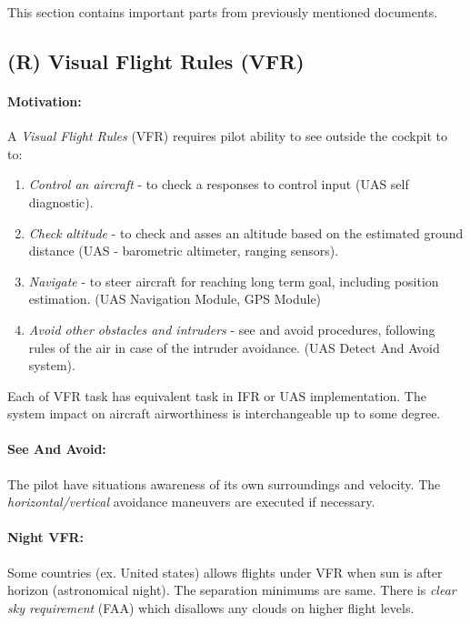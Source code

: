 \begin{note}
    This section contains important parts from previously mentioned documents. 
\end{note}

\subsection{(R) Visual Flight Rules (VFR)}\label{sec:VisualFlightRules}
\paragraph{Motivation:} A \emph{Visual Flight Rules} (VFR) requires pilot ability to see outside the cockpit to to:

\begin{enumerate}
    \item \emph{Control an aircraft} - to check a responses to control input (UAS self diagnostic).
    
    \item \emph{Check altitude} - to check and asses an altitude based on the estimated ground distance (UAS - barometric altimeter, ranging sensors).
    
    \item \emph{Navigate} - to steer aircraft for reaching long term goal, including position estimation. (UAS Navigation Module, GPS Module)
    
    \item \emph{Avoid other obstacles and intruders} - see and avoid procedures, following rules of the air in case of the intruder avoidance. (UAS Detect And Avoid system).
\end{enumerate}

\begin{note}
    Each of VFR task has equivalent task in IFR or UAS implementation. The system impact on aircraft airworthiness is interchangeable up to some degree.
\end{note}

\paragraph{See And Avoid:} The pilot have situations awareness of its own surroundings and velocity. The \emph{horizontal/vertical} avoidance maneuvers are executed if necessary. 

\paragraph{Night VFR:} Some countries (ex. United states) allows flights under VFR when sun is after horizon (astronomical night). The separation minimums are same. There is \emph{clear sky requirement} (FAA) which disallows any clouds on higher flight levels.



